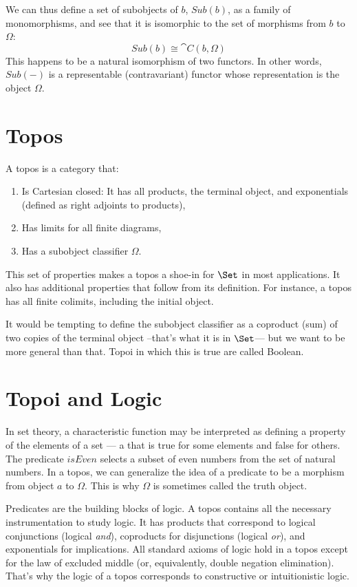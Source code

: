 We can thus define a set of subobjects of $b$, $\mathit{Sub}(b)$,
as a family of monomorphisms, and see that it is isomorphic to the set
of morphisms from $b$ to $\Omega$:
\[\mathit{Sub}(b) \cong \cat{C}(b, \Omega)\]
This happens to be a natural isomorphism of two functors. In other
words, $\mathit{Sub}(-)$ is a representable (contravariant) functor whose
representation is the object $\Omega$.

\section{Topos}

A topos is a category that:

\begin{enumerate}
  \tightlist
  \item
        Is Cartesian closed: It has all products, the terminal object, and
        exponentials (defined as right adjoints to products),
  \item
        Has limits for all finite diagrams,
  \item
        Has a subobject classifier $\Omega$.
\end{enumerate}

This set of properties makes a topos a shoe-in for $\Set$ in most
applications. It also has additional properties that follow from its
definition. For instance, a topos has all finite colimits, including the
initial object.

It would be tempting to define the subobject classifier as a coproduct
(sum) of two copies of the terminal object --that's what it is in
$\Set$--- but we want to be more general than that. Topoi in which
this is true are called Boolean.

\section{Topoi and Logic}

In set theory, a characteristic function may be interpreted as defining
a property of the elements of a set --- a  that is true
for some elements and false for others. The predicate $\mathit{isEven}$
selects a subset of even numbers from the set of natural numbers. In a
topos, we can generalize the idea of a predicate to be a morphism from
object $a$ to $\Omega$. This is why $\Omega$ is sometimes
called the truth object.

Predicates are the building blocks of logic. A topos contains all the
necessary instrumentation to study logic. It has products that
correspond to logical conjunctions (logical \emph{and}), coproducts for
disjunctions (logical \emph{or}), and exponentials for implications. All
standard axioms of logic hold in a topos except for the law of excluded
middle (or, equivalently, double negation elimination). That's why the
logic of a topos corresponds to constructive or intuitionistic logic.

